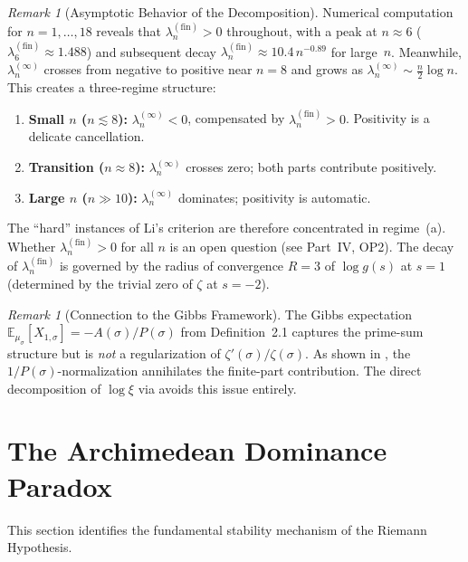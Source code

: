 \documentclass[12pt,a4paper]{article}
\theoremstyle{definition}
\theoremstyle{remark}
\newtheorem{remark}[theorem]{Remark}
\begin{document}
\begin{remark}[Asymptotic Behavior of the Decomposition]\label{rem:asymp-decomp}
Numerical computation for $n = 1, \ldots, 18$ reveals that $\lambda_n^{(\mathrm{fin})} > 0$ throughout, with a peak at $n \approx 6$ ($\lambda_6^{(\mathrm{fin})} \approx 1.488$) and subsequent decay $\lambda_n^{(\mathrm{fin})} \approx 10.4\,n^{-0.89}$ for large~$n$. Meanwhile, $\lambda_n^{(\infty)}$ crosses from negative to positive near $n = 8$ and grows as $\lambda_n^{(\infty)} \sim \frac{n}{2}\log n$. This creates a three-regime structure:
\begin{enumerate}[label=(\alph*)]
  \item \textbf{Small $n$ ($n \lesssim 8$):} $\lambda_n^{(\infty)} < 0$, compensated by $\lambda_n^{(\mathrm{fin})} > 0$. Positivity is a delicate cancellation.
  \item \textbf{Transition ($n \approx 8$):} $\lambda_n^{(\infty)}$ crosses zero; both parts contribute positively.
  \item \textbf{Large $n$ ($n \gg 10$):} $\lambda_n^{(\infty)}$ dominates; positivity is automatic.
\end{enumerate}
The ``hard'' instances of Li's criterion are therefore concentrated in regime~(a). Whether $\lambda_n^{(\mathrm{fin})} > 0$ for all $n$ is an open question (see Part~IV, OP2). The decay of $\lambda_n^{(\mathrm{fin})}$ is governed by the radius of convergence $R = 3$ of $\log g(s)$ at $s=1$ (determined by the trivial zero of $\zeta$ at $s=-2$).
\end{remark}

\begin{remark}[Connection to the Gibbs Framework]\label{rem:gibbs-connection}
The Gibbs expectation $\mathbb{E}_{\mu_\sigma}[X_{1,\sigma}] = -A(\sigma)/P(\sigma)$ from Definition~2.1 captures the prime-sum structure but is \emph{not} a regularization of $\zeta'(\sigma)/\zeta(\sigma)$. As shown in , the $1/P(\sigma)$-normalization annihilates the finite-part contribution. The direct decomposition of $\log\xi$ via  avoids this issue entirely.
\end{remark}

\section{The Archimedean Dominance Paradox}

This section identifies the fundamental stability mechanism of the Riemann Hypothesis.
\end{document}
